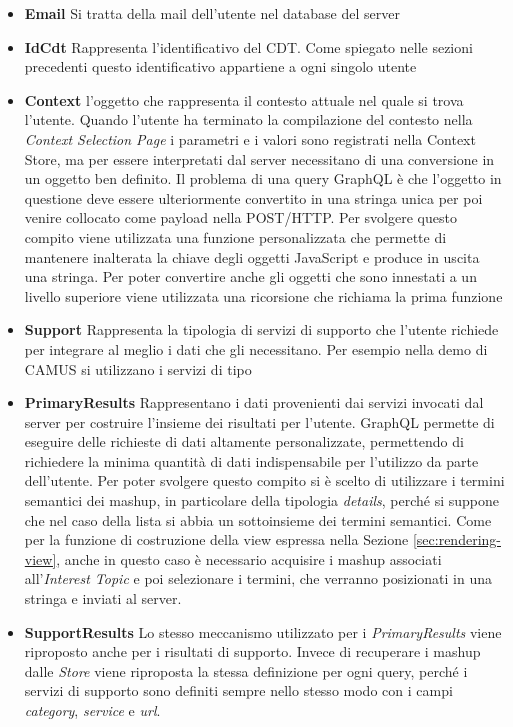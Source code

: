 \begin{itemize}
	\item \textbf{Email}
	Si tratta della mail dell'utente nel database del server
	\item \textbf{IdCdt}
	Rappresenta l'identificativo del CDT. Come spiegato nelle sezioni precedenti questo identificativo appartiene a ogni singolo utente
	\item \textbf{Context}
	\upe l'oggetto che rappresenta il contesto attuale nel quale si trova l'utente. Quando l'utente ha terminato la compilazione del contesto nella \emph{Context Selection Page} i parametri e i valori sono registrati nella Context Store, ma per essere interpretati dal server necessitano di una conversione in un oggetto ben definito. Il problema di una query GraphQL è che l'oggetto in questione deve essere ulteriormente convertito in una stringa unica per poi venire collocato come payload nella POST/HTTP. Per svolgere questo compito viene utilizzata una funzione personalizzata che permette di mantenere inalterata la chiave degli oggetti JavaScript e produce in uscita una stringa. Per poter convertire anche gli oggetti che sono innestati a un livello superiore viene utilizzata una ricorsione che richiama la prima funzione
	\item \textbf{Support}
	Rappresenta la tipologia di servizi di supporto che l'utente richiede per integrare al meglio i dati che gli necessitano. Per esempio nella demo di CAMUS si utilizzano i servizi di tipo 
	\item \textbf{PrimaryResults}
	Rappresentano i dati provenienti dai servizi invocati dal server per costruire l'insieme dei risultati per l'utente. GraphQL permette di eseguire delle richieste di dati altamente personalizzate, permettendo di richiedere la minima quantità di dati indispensabile per l'utilizzo da parte dell'utente. Per poter svolgere questo compito si è scelto di utilizzare i termini semantici dei mashup, in particolare della tipologia \emph{details}, perché si suppone che nel caso della lista si abbia un sottoinsieme dei termini semantici. Come per la funzione di costruzione della view espressa nella Sezione \ref{sec:rendering-view}, anche in questo caso è necessario acquisire i mashup associati all'\emph{Interest Topic} e poi selezionare i termini, che verranno posizionati in una stringa e inviati al server.
	\item \textbf{SupportResults}
	Lo stesso meccanismo utilizzato per i \emph{PrimaryResults} viene riproposto anche per i risultati di supporto. Invece di recuperare i mashup dalle \emph{Store} viene riproposta la stessa definizione per ogni query, perché i servizi di supporto sono definiti sempre nello stesso modo con i campi \emph{category}, \emph{service} e \emph{url}.
\end{itemize}

